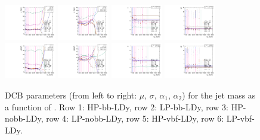 \begin{figure}[htbp]
  \includegraphics[width=0.2\textwidth]{fig/analysis/paramSignalShape_allSig_MJJ_HP_vbf_DEtaLo_mean.pdf}
  \includegraphics[width=0.2\textwidth]{fig/analysis/paramSignalShape_allSig_MJJ_HP_vbf_DEtaLo_sigma.pdf}
  \includegraphics[width=0.2\textwidth]{fig/analysis/paramSignalShape_allSig_MJJ_HP_vbf_DEtaLo_alpha.pdf}
  \includegraphics[width=0.2\textwidth]{fig/analysis/paramSignalShape_allSig_MJJ_HP_vbf_DEtaLo_alpha2.pdf}\\
  \includegraphics[width=0.2\textwidth]{fig/analysis/paramSignalShape_allSig_MJJ_LP_vbf_DEtaLo_mean.pdf}
  \includegraphics[width=0.2\textwidth]{fig/analysis/paramSignalShape_allSig_MJJ_LP_vbf_DEtaLo_sigma.pdf}
  \includegraphics[width=0.2\textwidth]{fig/analysis/paramSignalShape_allSig_MJJ_LP_vbf_DEtaLo_alpha.pdf}
  \includegraphics[width=0.2\textwidth]{fig/analysis/paramSignalShape_allSig_MJJ_LP_vbf_DEtaLo_alpha2.pdf}\\
  \caption{
    DCB parameters (from left to right: $\mu$, $\sigma$, $\alpha_1$, $\alpha_2$) for the jet mass \MJ as a function of \MX.
    Row 1: HP-bb-LDy, row 2: LP-bb-LDy, row 3: HP-nobb-LDy, row 4: LP-nobb-LDy, row 5: HP-vbf-LDy, row 6: LP-vbf-LDy.
  }
  \label{fig:MJJShapeParam_LDy_Run2}
\end{figure}

